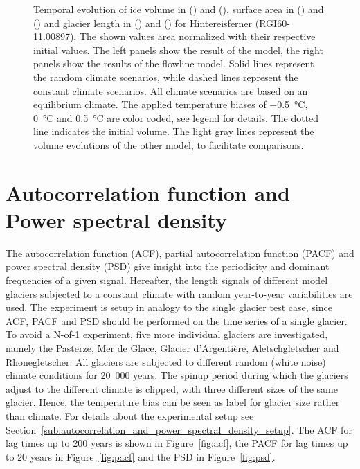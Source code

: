 \begin{figure}[p]
      \caption{Temporal evolution of ice volume in () and (), surface area in () and () and glacier length in () and () for Hintereisferner (RGI60-11.00897). The shown values area normalized with their respective initial values. The left panels show the result of the \vas{} model, the right panels show the results of the flowline model. Solid lines represent the random climate scenarios, while dashed lines represent the constant climate scenarios. All climate scenarios are based on an equilibrium climate. The applied temperature biases of \SI{-.5}{\celsius}, \SI{0}{\celsius} and \SI{+.5}{\celsius} are color coded, see legend for details. The dotted line indicates the initial volume. The light gray lines represent the volume evolutions of the other model, to facilitate comparisons.}
      \label{fig:hintereisferner}
    \end{figure}



  \section{Autocorrelation function and Power spectral density} %
  \label{sec:autocorrelation_and_power_spectral_density_results}
    
    The autocorrelation function (ACF), partial autocorrelation function (PACF) and power spectral density (PSD) give insight into the periodicity and dominant frequencies of a given signal. Hereafter, the length signals of different model glaciers subjected to a constant climate with random year-to-year variabilities are used. The experiment is setup in analogy to the single glacier test case, since ACF, PACF and PSD should be performed on the time series of a single glacier. To avoid a N-of-1 experiment, five more individual glaciers are investigated, namely the Pasterze, Mer de Glace, Glacier d'Argentière, Aletschgletscher and Rhonegletscher. All glaciers are subjected to different random (white noise) climate conditions for 20\ 000 years. The spinup period during which the glaciers adjust to the different climate is clipped, with three different sizes of the same glacier. Hence, the temperature bias can be seen as label for glacier size rather than climate. For details about the experimental setup see Section~\ref{sub:autocorrelation_and_power_spectral_density_setup}. The ACF for lag times up to 200 years is shown in Figure~\ref{fig:acf}, the PACF for lag times up to 20 years in Figure~\ref{fig:pacf} and the PSD in Figure~\ref{fig:psd}. 

